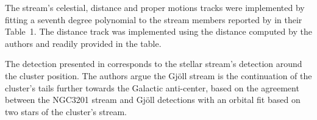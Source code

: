 The stream's celestial, distance and proper motions tracks were implemented by fitting a seventh degree polynomial to the stream members reported by \citet{Ibata2021} in their Table~1. The distance track was implemented using the distance computed by the authors and readily provided in the table.

The detection presented in \citet{Ibata2021} corresponds to the stellar stream's detection around the cluster position. The authors argue the Gj\"oll stream is the continuation of the cluster's tails further towards the Galactic anti-center, based on the agreement between the NGC3201 stream and Gj\"oll detections with an orbital fit based on two stars of the cluster's stream. 
